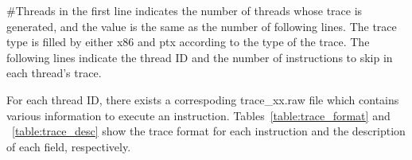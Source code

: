 \#Threads in the first line indicates the number of threads whose trace is 
generated, and the value is the same as the number of following lines. The trace
type is filled by either x86 and ptx according to the type of the trace. The following
lines indicate the thread ID and the number of instructions to skip in each thread's trace.

\begin{table*}[htb]
\end{table*}

For each thread ID, there exists a correspoding trace\_xx.raw file which
contains various information to execute an instruction.
Tables~\ref{table:trace_format} and ~\ref{table:trace_desc} show the trace
format for each instruction and the description of each field, respectively.

